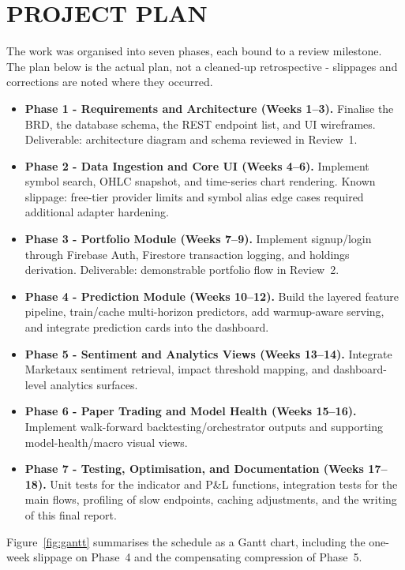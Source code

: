 \documentclass[12pt,a4paper]{report}
\numberwithin{equation}{chapter}
\begin{document}
\section{PROJECT PLAN}

The work was organised into seven phases, each bound to a review milestone. The plan below is the actual plan, not a cleaned-up retrospective - slippages and corrections are noted where they occurred.

\begin{itemize}
  \item \textbf{Phase 1 - Requirements and Architecture (Weeks 1--3).} Finalise the BRD, the database schema, the REST endpoint list, and UI wireframes. Deliverable: architecture diagram and schema reviewed in Review~1.
  \item \textbf{Phase 2 - Data Ingestion and Core UI (Weeks 4--6).} Implement symbol search, OHLC snapshot, and time-series chart rendering. Known slippage: free-tier provider limits and symbol alias edge cases required additional adapter hardening.
  \item \textbf{Phase 3 - Portfolio Module (Weeks 7--9).} Implement signup/login through Firebase Auth, Firestore transaction logging, and holdings derivation. Deliverable: demonstrable portfolio flow in Review~2.
  \item \textbf{Phase 4 - Prediction Module (Weeks 10--12).} Build the layered feature pipeline, train/cache multi-horizon predictors, add warmup-aware serving, and integrate prediction cards into the dashboard.
  \item \textbf{Phase 5 - Sentiment and Analytics Views (Weeks 13--14).} Integrate Marketaux sentiment retrieval, impact threshold mapping, and dashboard-level analytics surfaces.
  \item \textbf{Phase 6 - Paper Trading and Model Health (Weeks 15--16).} Implement walk-forward backtesting/orchestrator outputs and supporting model-health/macro visual views.
  \item \textbf{Phase 7 - Testing, Optimisation, and Documentation (Weeks 17--18).} Unit tests for the indicator and P\&L functions, integration tests for the main flows, profiling of slow endpoints, caching adjustments, and the writing of this final report.
\end{itemize}

Figure~\ref{fig:gantt} summarises the schedule as a Gantt chart, including the one-week slippage on Phase~4 and the compensating compression of Phase~5.
\end{document}
